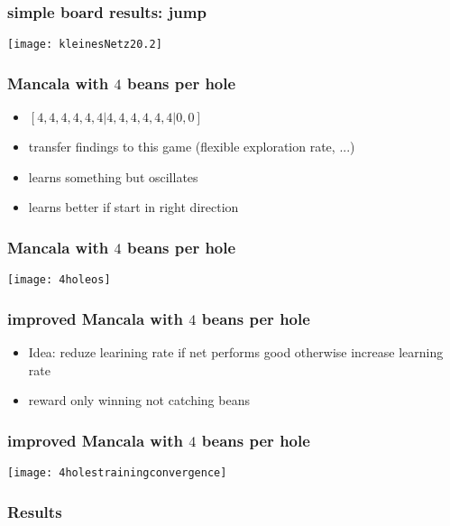 \documentclass{beamer}
\begin{document}
 \begin{frame}
 \frametitle{simple board results: jump}
 \texttt{[image: kleinesNetz20.2]}
 \end{frame}

 \begin{frame}
 \frametitle{Mancala with $4$ beans per hole}
 \begin{itemize}
\item  $[4,4,4,4,4,4|4,4,4,4,4,4|0,0]$
\item transfer findings to this game (flexible exploration rate, ...)
\item learns something but oscillates 
\item  learns better if start in right direction
\end{itemize}
 \end{frame}

 \begin{frame}
 \frametitle{Mancala with $4$ beans per hole}
 \texttt{[image: 4holeos]}
 \end{frame}

\begin{frame}
\frametitle{improved Mancala with $4$ beans per hole}
\begin{itemize}
\item Idea: reduze learining rate if net performs good otherwise increase learning rate
\item reward only winning not catching beans
\end{itemize}
\end{frame}

 \begin{frame}
\frametitle{improved Mancala with $4$ beans per hole}
 \texttt{[image: 4holestrainingconvergence]}
 \end{frame}

\begin{frame} 
\frametitle{Results}
\end{frame}
\end{document}
